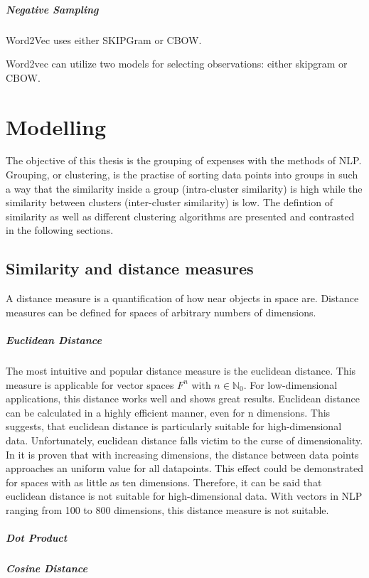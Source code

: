 		
		\subparagraph{Negative Sampling}
		
		
		Word2Vec uses either SKIPGram or CBOW.
		
		Word2vec can utilize two models for selecting observations: either skipgram or \ac{CBOW}. 
		
	
		
\section{Modelling}
	The objective of this thesis is the grouping of expenses with the methods of \ac{NLP}. Grouping, or clustering, is the practise of sorting data points into groups in such a way that the similarity inside a group (intra-cluster similarity) is high while the similarity between clusters (inter-cluster similarity) is low. The defintion of similarity as well as different clustering algorithms are presented and contrasted in the following sections.
	
	\subsection{Similarity and distance measures}
	A distance measure is a quantification of how near objects in space are. Distance measures can be defined for spaces of arbitrary numbers of dimensions. 
	
	
	
	\subparagraph{Euclidean Distance} \label{euclidean}
	The most intuitive and popular distance measure is the euclidean distance. This measure is applicable for vector spaces $F^{n}$ with $n \in \mathbb{N}_0 $. For low-dimensional applications, this distance works well and shows great results. Euclidean distance can be calculated in a highly efficient manner, even for n dimensions. This suggests, that euclidean distance is particularly suitable for high-dimensional data. Unfortunately, euclidean distance falls victim to the curse of dimensionality. In \cite{beyerNearestNeighbor} it is proven that with increasing dimensions, the distance between data points approaches an uniform value for all datapoints. This effect could be demonstrated for spaces with as little as ten dimensions. Therefore, it can be said that euclidean distance is not suitable for high-dimensional data. With vectors in \ac{NLP} ranging from 100 to 800 dimensions, this distance measure is not suitable.
	
	\subparagraph{Dot Product}
	
	
	\subparagraph{Cosine Distance}
	
